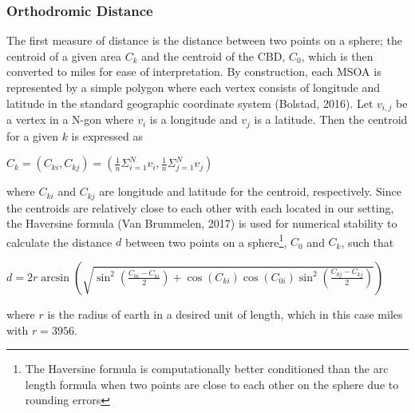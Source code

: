 \documentclass{article}
\begin{document}
\subsubsection{Orthodromic Distance}
The first measure of distance is the distance between two points on a sphere; the centroid of a given area $C_k$ and the centroid of the CBD, $C_0$, which is then converted to miles for ease of interpretation. By construction, each MSOA is represented by a simple polygon where each vertex consists of longitude and latitude in the standard geographic coordinate system (Bolstad, 2016). Let $v_{i,j}$ be a vertex in a N-gon where $v_i$ is a longitude and $v_j$ is a latitude. Then the centroid for a given $k$ is expressed as 

\begin{center}
    $C_k = (C_{ki}, C_{kj})  = (\frac{1}{n} \Sigma_{i=1}^{N} v_i, \frac{1}{n} \Sigma_{j=1}^{N} v_j) $
\end{center}

where $C_{ki}$ and $C_{kj}$ are longitude and latitude for the centroid, respectively. Since the centroids are relatively close to each other with each located in our setting, the Haversine formula (Van Brummelen, 2017) is used for numerical stability to calculate the distance $d$ between two points on a sphere\footnote{The Haversine formula is computationally better conditioned than the arc length formula when two points are close to each other on the sphere due to rounding errors}, $C_0$ and $C_k$, such that

\begin{center}
    $d =2 r \arcsin \left(\sqrt{\sin ^{2}\left(\frac{C_{0i}-C_{ki}}{2}\right)+\cos \left(C_{ki}\right) \cos \left(C_{0i}\right) \sin ^{2}\left(\frac{C_{0j}-C_{kj}}{2}\right)}\right)$
\end{center}
where $r$ is the radius of earth in a desired unit of length, which in this case miles with $r = 3956$. 
\end{document}
